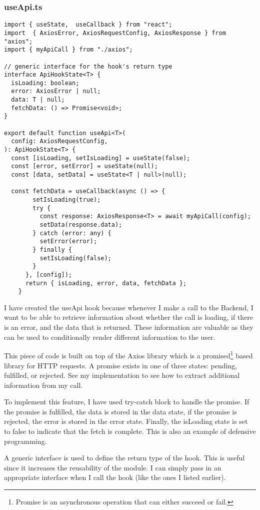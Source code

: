 \subsubsection{useApi.ts}
\begin{verbatim}
import { useState,  useCallback } from "react";
import  { AxiosError, AxiosRequestConfig, AxiosResponse } from "axios";
import { myApiCall } from "./axios";

// generic interface for the hook's return type
interface ApiHookState<T> {
  isLoading: boolean;
  error: AxiosError | null; 
  data: T | null;
  fetchData: () => Promise<void>;
}

export default function useApi<T>(
  config: AxiosRequestConfig,
): ApiHookState<T> {
  const [isLoading, setIsLoading] = useState(false);
  const [error, setError] = useState(null);
  const [data, setData] = useState<T | null>(null);

  const fetchData = useCallback(async () => {
        setIsLoading(true);
        try {
          const response: AxiosResponse<T> = await myApiCall(config);
          setData(response.data);
        } catch (error: any) {
          setError(error);
        } finally {
          setIsLoading(false);
        }
      }, [config]);
      return { isLoading, error, data, fetchData };
    }
\end{verbatim}
I have created the useApi hook because whenever I make a call to the Backend, I want to be able to retrieve information about whether the call is loading, if there is an error, and the data that is returned. These information are valuable as they can be used to conditionally render different information to the user. 

This piece of code is built on top of the Axios library which is a promised\footnote{Promise is an asynchronous operation that can either succeed or fail. }  based library for HTTP requests. A promise exists in one of three states: pending, fulfilled, or rejected. See my implementation to see how to extract additional information from my call.

To implement this feature, I have used try-catch block to handle the promise. If the promise is fulfilled, the data is stored in the data state, if the promise is rejected, the error is stored in the error state. Finally, the isLoading state is set to false to indicate that the fetch is complete. This is also an example of defensive programming.

A generic interface is used to define the return type of the hook. This is useful since it increases the reusability of the module. I can simply pass in an appropriate interface when I call the hook (like the ones I listed earlier).

